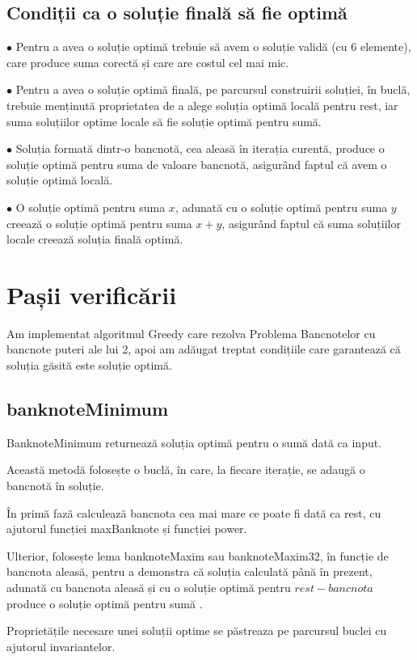     \subsection{Condiții ca o soluție finală să fie optimă}
    $\bullet$ Pentru a avea o soluție optimă trebuie să avem o soluție validă (cu 6 elemente), care produce suma corectă
     și care are costul cel mai mic.\par
    $\bullet$ Pentru a avea o soluție optimă finală, pe parcursul construirii soluției, în buclă, trebuie menținută proprietatea
     de a alege soluția optimă locală pentru rest, iar suma soluțiilor optime locale să fie soluție optimă pentru sumă.\par
    $\bullet$ Soluția formată dintr-o bancnotă, cea aleasă în iterația curentă, produce o soluție optimă pentru suma 
    de valoare bancnotă, asigurând faptul că avem o soluție optimă locală.\par
    $\bullet$ O soluție optimă pentru suma $x$, adunată cu o soluție optimă pentru suma $y$ creează o soluție optimă pentru suma $x+y$, 
    asigurând faptul că suma soluțiilor locale creează soluția finală optimă.\par
    
\section{Pașii verificării}
Am implementat algoritmul Greedy care rezolva Problema Bancnotelor cu bancnote puteri ale lui 2, 
apoi am adăugat treptat condițiile care garantează că soluția găsită este soluție optimă.
    \subsection{banknoteMinimum}
    BanknoteMinimum returnează soluția optimă pentru o sumă dată ca input.\par
    Această metodă folosește o buclă, în care, la fiecare iterație, se adaugă o bancnotă în soluție.\par
    În primă fază calculează bancnota cea mai mare ce poate fi dată ca rest, cu ajutorul funcției maxBanknote și funcției 
    power.\par
    Ulterior, folosește lema banknoteMaxim sau banknoteMaxim32, în funcție de bancnota aleasă, pentru a demonstra 
    că soluția calculată până în prezent, adunată cu bancnota aleasă și cu o soluție optimă pentru $rest - bancnota$ 
    produce o soluție optimă pentru sumă .\par
    Proprietățile necesare unei soluții optime se păstreaza pe parcursul buclei cu ajutorul invariantelor.\par
     
